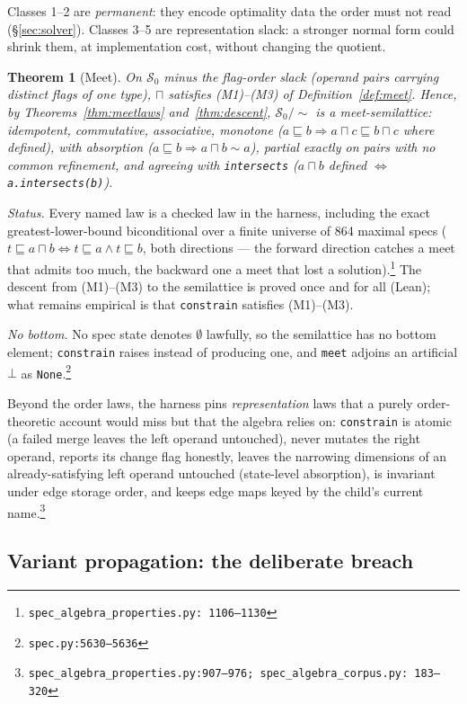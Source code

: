 \documentclass[11pt]{article}
\newtheorem{theorem}{Theorem}[section]
\theoremstyle{definition}
\theoremstyle{remark}
\newcommand{\sat}{\sqsubseteq}
\renewcommand{\ker}{\sim}
\newcommand{\meet}{\sqcap}
\newcommand{\Spec}{\mathcal{S}}
\newcommand{\code}[1]{\texttt{#1}}
\newcommand{\src}[1]{\footnote{\code{#1}}}
\begin{document}
Classes 1--2 are \emph{permanent}: they encode optimality data the order must
not read (\S\ref{sec:solver}).  Classes 3--5 are representation slack: a
stronger normal form could shrink them, at implementation cost, without
changing the quotient.

\begin{theorem}[Meet]\label{thm:constrainmeet}
On $\Spec_0$ minus the flag-order slack (operand pairs carrying distinct
flags of one type), $\meet$ satisfies (M1)--(M3) of
Definition~\ref{def:meet}.  Hence, by Theorems~\ref{thm:meetlaws}
and~\ref{thm:descent}, $\Spec_0/\!\ker$ is a meet-semilattice: idempotent,
commutative, associative, monotone
($a \sat b \Rightarrow a \meet c \sat b \meet c$ where defined), with
absorption ($a \sat b \Rightarrow a \meet b \ker a$), partial exactly on
pairs with no common refinement, and agreeing with \code{intersects}
($a \meet b$ defined $\iff$ \code{a.intersects(b)}).
\end{theorem}

\emph{Status.}  Every named law is a checked law in the harness, including the
exact greatest-lower-bound biconditional over a finite universe of 864
maximal specs ($t \sat a \meet b \iff t \sat a \wedge t \sat b$, both
directions --- the forward direction catches a meet that admits too much, the
backward one a meet that lost a solution).\src{spec\_algebra\_properties.py:%
1106--1130}  The descent from (M1)--(M3) to the semilattice is proved once and
for all (Lean); what remains empirical is that \code{constrain} satisfies
(M1)--(M3).

\emph{No bottom.}  No spec state denotes $\emptyset$ lawfully, so the
semilattice has no bottom element; \code{constrain} raises instead of
producing one, and \code{meet} adjoins an artificial $\bot$ as
\code{None}.\src{spec.py:5630--5636}

Beyond the order laws, the harness pins \emph{representation} laws that a
purely order-theoretic account would miss but that the algebra relies on:
\code{constrain} is atomic (a failed merge leaves the left operand
untouched), never mutates the right operand, reports its change flag
honestly, leaves the narrowing dimensions of an already-satisfying left
operand untouched (state-level absorption), is invariant under edge storage
order, and keeps edge maps keyed by the child's current
name.\src{spec\_algebra\_properties.py:907--976; spec\_algebra\_corpus.py:%
183--320}

\subsection{Variant propagation: the deliberate breach}\label{sec:propagation}
\end{document}
